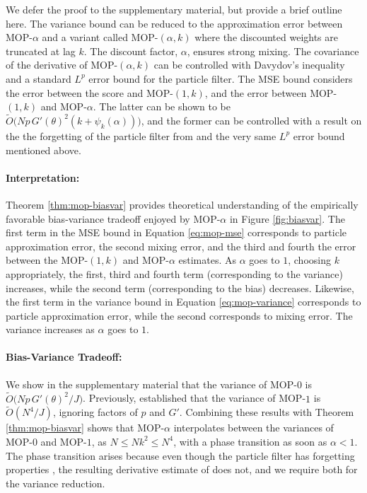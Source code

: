\documentclass[9pt,twocolumn,pnasresearcharticle]{pnas-new}
\newcommand\arxiv[2]{#2} %
\begin{document}
We defer the proof to \arxiv{Appendix~\ref{appendix:biasvar}}{the supplementary material}, but provide a brief outline here. 
The variance bound can be reduced to the approximation error between MOP-$\alpha$ and a variant called MOP-$(\alpha,k)$ where the discounted weights are truncated at lag $k$. 
The discount factor, $\alpha$, ensures strong mixing.
The covariance of the derivative of MOP-$(\alpha,k)$ can be controlled with Davydov's inequality and a standard $L^p$ error bound for the particle filter. 
The MSE bound considers the error between the score and MOP-$(1,k)$, and the error between MOP-$(1,k)$ and MOP-$\alpha$. 
The latter can be shown to be $\tilde{O}\big(Np \, G'(\theta)^2(k+\psi_k(\alpha))\big)$, and the former can be controlled with a result on the the forgetting of the particle filter from \cite{karjalainen23} and the very same $L^p$ error bound mentioned above. 

\arxiv{}{\vspace*{-1mm}}
\paragraph{Interpretation:} Theorem \ref{thm:mop-biasvar} provides theoretical understanding of the empirically favorable bias-variance tradeoff enjoyed by MOP-$\alpha$ in Figure \ref{fig:biasvar}.
The first term in the MSE bound in Equation \ref{eq:mop-mse} corresponds to particle approximation error, the second mixing error, and the third and fourth the error between the MOP-$(1,k)$ and MOP-$\alpha$ estimates. 
As $\alpha$ goes to $1$, choosing $k$ appropriately, the first, third and fourth term (corresponding to the variance) increases, while the second term (corresponding to the bias) decreases. 
Likewise, the first term in the variance bound in Equation \ref{eq:mop-variance} corresponds to particle approximation error, while the second corresponds to mixing error. 
The variance increases as $\alpha$ goes to $1$. 

\arxiv{}{\vspace*{-1mm}}
\paragraph{Bias-Variance Tradeoff:} We show in \arxiv{Appendix~\ref{appendix:biasvar}}{the supplementary material} that the variance of MOP-$0$ is $\tilde{O}\big( Np \, G'(\theta)^2\big/J \big)$.
Previously, \cite{poyiadjis11} established that the variance of MOP-$1$ is $\tilde{O}(N^4/J)$, ignoring factors of $p$ and $G'$. 
Combining these results with Theorem \ref{thm:mop-biasvar} shows that MOP-$\alpha$ interpolates between the variances of MOP-$0$ and MOP-$1$, as $N \leq Nk^2 \leq N^4$, with a phase transition as soon as $\alpha<1$. 
The phase transition arises because even though the particle filter has forgetting properties \cite{karjalainen23}, the resulting derivative estimate of \cite{poyiadjis11} does not, and we require both for the variance reduction. 
\end{document}
